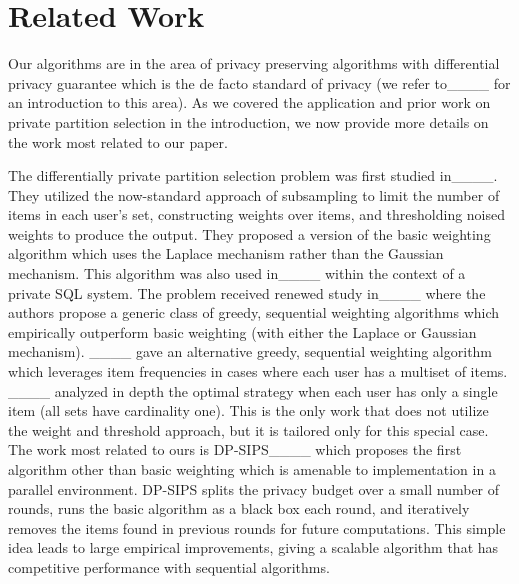 \section{Related Work}
Our algorithms are in the area of privacy preserving algorithms with differential privacy guarantee which is the de facto standard of privacy (we refer to____ for an introduction to this area). As we covered the application and prior work on private partition selection in the introduction, we now provide more details on the work most related to our paper.

The differentially private partition selection problem was first studied in____. They utilized the now-standard approach of subsampling to limit the number of items in each user's set, constructing weights over items, and thresholding noised weights to produce the output. They proposed a version of the basic weighting algorithm which uses the Laplace mechanism rather than the Gaussian mechanism. This algorithm was also used in____ within the context of a private SQL system.
The problem received renewed study in____ where the authors propose a generic class of greedy, sequential weighting algorithms which empirically outperform basic weighting (with either the Laplace or Gaussian mechanism). ____ gave an alternative greedy, sequential weighting algorithm which leverages item frequencies in cases where each user has a multiset of items.
____ analyzed in depth the optimal strategy when each user has only a single item (all sets have cardinality one). This is the only work that does not utilize the weight and threshold approach, but it is tailored only for this special case.
The work most related to ours is DP-SIPS____ which proposes the first algorithm other than basic weighting which is amenable to implementation in a parallel environment. DP-SIPS splits the privacy budget over a small number of rounds, runs the basic algorithm as a black box each round, and iteratively removes the items found in previous rounds for future computations. This simple idea leads to large empirical improvements, giving a scalable algorithm that has competitive performance with sequential algorithms.